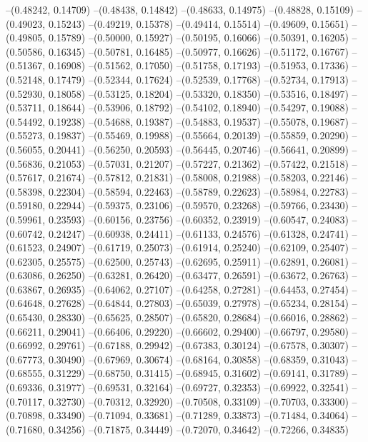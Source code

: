 --(0.48242, 0.14709)
--(0.48438, 0.14842)
--(0.48633, 0.14975)
--(0.48828, 0.15109)
--(0.49023, 0.15243)
--(0.49219, 0.15378)
--(0.49414, 0.15514)
--(0.49609, 0.15651)
--(0.49805, 0.15789)
--(0.50000, 0.15927)
--(0.50195, 0.16066)
--(0.50391, 0.16205)
--(0.50586, 0.16345)
--(0.50781, 0.16485)
--(0.50977, 0.16626)
--(0.51172, 0.16767)
--(0.51367, 0.16908)
--(0.51562, 0.17050)
--(0.51758, 0.17193)
--(0.51953, 0.17336)
--(0.52148, 0.17479)
--(0.52344, 0.17624)
--(0.52539, 0.17768)
--(0.52734, 0.17913)
--(0.52930, 0.18058)
--(0.53125, 0.18204)
--(0.53320, 0.18350)
--(0.53516, 0.18497)
--(0.53711, 0.18644)
--(0.53906, 0.18792)
--(0.54102, 0.18940)
--(0.54297, 0.19088)
--(0.54492, 0.19238)
--(0.54688, 0.19387)
--(0.54883, 0.19537)
--(0.55078, 0.19687)
--(0.55273, 0.19837)
--(0.55469, 0.19988)
--(0.55664, 0.20139)
--(0.55859, 0.20290)
--(0.56055, 0.20441)
--(0.56250, 0.20593)
--(0.56445, 0.20746)
--(0.56641, 0.20899)
--(0.56836, 0.21053)
--(0.57031, 0.21207)
--(0.57227, 0.21362)
--(0.57422, 0.21518)
--(0.57617, 0.21674)
--(0.57812, 0.21831)
--(0.58008, 0.21988)
--(0.58203, 0.22146)
--(0.58398, 0.22304)
--(0.58594, 0.22463)
--(0.58789, 0.22623)
--(0.58984, 0.22783)
--(0.59180, 0.22944)
--(0.59375, 0.23106)
--(0.59570, 0.23268)
--(0.59766, 0.23430)
--(0.59961, 0.23593)
--(0.60156, 0.23756)
--(0.60352, 0.23919)
--(0.60547, 0.24083)
--(0.60742, 0.24247)
--(0.60938, 0.24411)
--(0.61133, 0.24576)
--(0.61328, 0.24741)
--(0.61523, 0.24907)
--(0.61719, 0.25073)
--(0.61914, 0.25240)
--(0.62109, 0.25407)
--(0.62305, 0.25575)
--(0.62500, 0.25743)
--(0.62695, 0.25911)
--(0.62891, 0.26081)
--(0.63086, 0.26250)
--(0.63281, 0.26420)
--(0.63477, 0.26591)
--(0.63672, 0.26763)
--(0.63867, 0.26935)
--(0.64062, 0.27107)
--(0.64258, 0.27281)
--(0.64453, 0.27454)
--(0.64648, 0.27628)
--(0.64844, 0.27803)
--(0.65039, 0.27978)
--(0.65234, 0.28154)
--(0.65430, 0.28330)
--(0.65625, 0.28507)
--(0.65820, 0.28684)
--(0.66016, 0.28862)
--(0.66211, 0.29041)
--(0.66406, 0.29220)
--(0.66602, 0.29400)
--(0.66797, 0.29580)
--(0.66992, 0.29761)
--(0.67188, 0.29942)
--(0.67383, 0.30124)
--(0.67578, 0.30307)
--(0.67773, 0.30490)
--(0.67969, 0.30674)
--(0.68164, 0.30858)
--(0.68359, 0.31043)
--(0.68555, 0.31229)
--(0.68750, 0.31415)
--(0.68945, 0.31602)
--(0.69141, 0.31789)
--(0.69336, 0.31977)
--(0.69531, 0.32164)
--(0.69727, 0.32353)
--(0.69922, 0.32541)
--(0.70117, 0.32730)
--(0.70312, 0.32920)
--(0.70508, 0.33109)
--(0.70703, 0.33300)
--(0.70898, 0.33490)
--(0.71094, 0.33681)
--(0.71289, 0.33873)
--(0.71484, 0.34064)
--(0.71680, 0.34256)
--(0.71875, 0.34449)
--(0.72070, 0.34642)
--(0.72266, 0.34835)
